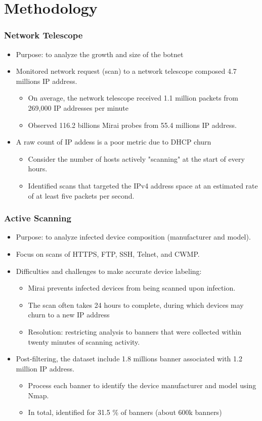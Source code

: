 \documentclass{beamer}
\begin{document}
\section{Methodology}

\begin{frame}
	\frametitle{Network Telescope}
	\begin{itemize}
		\item<+-> Purpose: to analyze the growth and size of the botnet
		\item<+-> Monitored network request (scan) to a network telescope composed 4.7 millions IP address.
		\begin{itemize}
			\item<+-> On average, the network telescope received 1.1 million packets from 269,000 IP addresses per minute 
			\item<+-> Observed 116.2 billions Mirai probes from 55.4 millions IP address.
		\end{itemize}
		\item<+-> A raw count of IP addess is a poor metric due to DHCP churn
		\begin{itemize}
			\item<+-> Consider the number of hosts actively "scanning" at the start of every hours.
			\item<+-> Identified scans that targeted the IPv4 address space at an estimated rate of at least five packets per second.
		\end{itemize}
	\end{itemize}
\end{frame}

\begin{frame}
	\frametitle{Active Scanning}
	\begin{itemize}
		\item<+-> Purpose: to analyze infected device composition (manufacturer and model).
		\item<+-> Focus on scans of HTTPS, FTP, SSH, Telnet, and CWMP.
		\item<+-> Difficulties and challenges to make accurate device labeling:		
		\begin{itemize}
			\item<+-> Mirai prevents infected devices from being scanned upon infection.
			\item<+-> The scan often takes 24 hours to complete, during which devices may churn to a new IP address
			\item<+-> Resolution: restricting analysis to banners that were collected within twenty minutes of scanning activity.
		\end{itemize}
		\item<+-> Post-filtering, the dataset include 1.8 millions banner associated with 1.2 million IP address.
		\begin{itemize}
			\item<+-> Process each banner to identify the device manufacturer and model using Nmap.
			\item<+-> In total, identified for 31.5 \% of banners (about 600k banners)
		\end{itemize}
	\end{itemize}
\end{frame}
\end{document}
